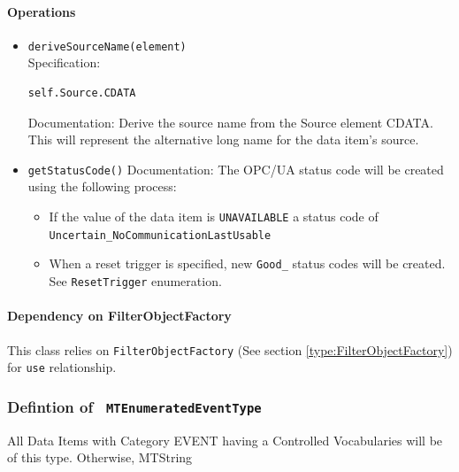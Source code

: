\paragraph{Operations}
\begin{itemize}
  \item \texttt{deriveSourceName(element)}\\
    Specification:
   \indent \begin{Verbatim}[xleftmargin=.25in,fontsize=\small]
self.Source.CDATA
\end{Verbatim}

    Documentation: Derive the source name from the Source element CDATA. This will represent the alternative long name for the data item's source.

  \item \texttt{getStatusCode()}
    Documentation: The OPC/UA status code will be created using the following process:

\begin{itemize}
  \item If the value of the data item is \texttt{UNAVAILABLE} a status code of \texttt{Uncertain_NoCommunicationLastUsable}
  \item When a reset trigger is specified, new \texttt{Good_} status codes will be created. See \texttt{ResetTrigger} enumeration.
\end{itemize}

\end{itemize}
\paragraph{Dependency on FilterObjectFactory}

This class relies on \texttt{FilterObjectFactory} (See section \ref{type:FilterObjectFactory}) for \texttt{use} relationship.

\FloatBarrier
\subsubsection{Defintion of \texttt{ MTEnumeratedEventType}} \label{type:MTEnumeratedEventType}

\FloatBarrier

All Data Items with Category EVENT having a Controlled Vocabularies will be of this type. Otherwise, MTString

